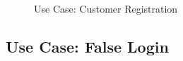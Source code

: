 \documentclass[a4paper,12pt]{report}
\begin{document}
\begin{figure}[!htbp]
	\caption{\label{fig:uc_customer_registration }Use Case: Customer Registration}	
\end{figure}



\subsection{Use Case: False Login}
\end{document}
